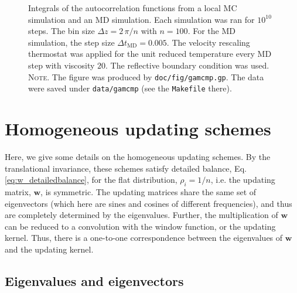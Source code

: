\documentclass[reprint, superscriptaddress, floatfix]{revtex4-1}
\newcommand{\note}[1]{{\color{DarkGreen}\footnotesize \textsc{Note.} #1}}
\begin{document}
\begin{figure}[h]
\begin{center}
  \caption{
    \label{fig:gamcmp}
    Integrals of the autocorrelation functions
    from a local MC simulation
    and an MD simulation.
    Each simulation was ran for $10^{10}$ steps.
    The bin size $\Delta z = 2\, \pi /n$ with $n = 100$.
    For the MD simulation,
    the step size $\Delta t_\mathrm{MD} = 0.005$.
    The velocity rescaling thermostat\cite{bussi2007} was
    applied for the unit reduced temperature
    every MD step with viscosity $20$.
    The reflective boundary condition was used.
    \note{The figure was produced by \texttt{doc/fig/gamcmp.gp}.
      The data were saved under \texttt{data/gamcmp}
      (see the \texttt{Makefile} there).
    }%
  }
\end{center}
\end{figure}






\section{\label{sec:more_wband}
Homogeneous updating schemes
}


Here, we give some details
on the homogeneous updating schemes.
%
By the translational invariance,
these schemes
satisfy detailed balance,
Eq. \eqref{eq:w_detailedbalance},
for the flat distribution, $\rho_i = 1/n$,
i.e. the updating matrix, $\mathbf w$,
is symmetric.
%
The updating matrices
share the same set of eigenvectors
(which here are sines and cosines of different frequencies),
and thus are completely determined
by the eigenvalues.
%
Further, the multiplication of $\mathbf w$
can be reduced to a convolution with the window function,
or the updating kernel.
%
Thus,
there is a one-to-one correspondence between
the eigenvalues of $\mathbf w$
and the updating kernel.



\subsection{\label{sec:wband_eig}
Eigenvalues and eigenvectors}
\end{document}
